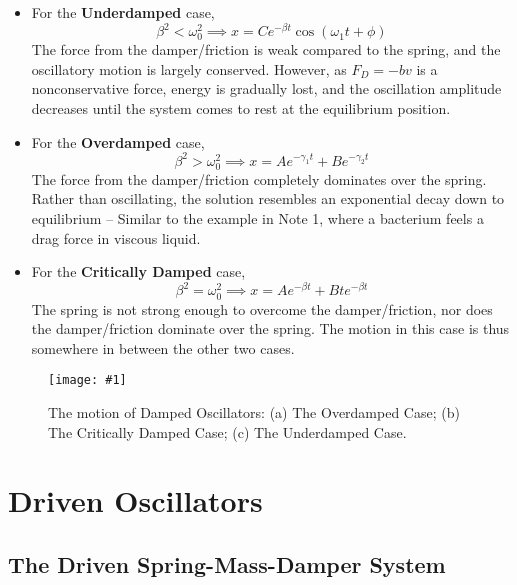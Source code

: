 \documentclass[11pt]{article}
\newcommand{\fig}[4]{
    \begin{figure}[H]
        \centering
        \texttt{[image: \#1]}
        \caption{#2}
        \label{exp4fit}
    \end{figure}
}
\theoremstyle{gangnamstyle}{\newtheorem{definition}{Definition}[]}
\theoremstyle{gangnamstyle}{\newtheorem{example}{Example}[]}
\theoremstyle{gangnamstyle}{\newtheorem{problem}{Problem}[]}
\theoremstyle{gangnamstyle}{\newtheorem{warning}{Warning}[]}
\begin{document}
\begin{itemize}
\item For the \textbf{Underdamped} case, 
\[ \beta^2 < \omega_0^2 \implies x = Ce^{-\beta t}\cos(\omega_1 t + \phi) \]
The force from the damper/friction is weak compared to the spring, and the oscillatory motion is largely conserved. However, as $F_D = -bv$ is a nonconservative force, energy is gradually lost, and the oscillation amplitude decreases until the system comes to rest at the equilibrium position. 
\item For the \textbf{Overdamped} case, 
\[ \beta^2 > \omega_0^2 \implies x = Ae^{-\gamma_1t} + Be^{-\gamma_2t} \]
The force from the damper/friction completely dominates over the spring. Rather than oscillating, the solution resembles an exponential decay down to equilibrium -- Similar to the example in Note 1, where a bacterium feels a drag force in viscous liquid. 
\item For the \textbf{Critically Damped} case, 
\[ \beta^2 = \omega_0^2 \implies x = Ae^{-\beta t} + Bte^{-\beta t} \]
The spring is not strong enough to overcome the damper/friction, nor does the damper/friction dominate over the spring. The motion in this case is thus somewhere in between the other two cases. 
\end{itemize}

\fig{figs/n2/oscillators.jpg}{The motion of Damped Oscillators: (a) The Overdamped Case; (b) The Critically Damped Case; (c) The Underdamped Case. }{0.6}{0}

\pagebreak

\section{Driven Oscillators}
\subsection{The Driven Spring-Mass-Damper System}
\end{document}
